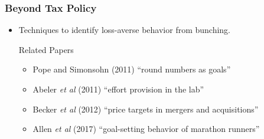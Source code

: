 \documentclass[dvipdfmx,12pt]{beamer}
\begin{document}
\begin{frame}\frametitle{Beyond Tax Policy}
  \begin{itemize}
    \item Techniques to identify loss-averse behavior from bunching.

    \begin{block}{Related Papers}
      \begin{itemize}
        \item Pope and Simonsohn (2011) ``round numbers as goals''

        \item Abeler \textit{et al} (2011) ``effort provision in the lab''

        \item Becker \textit{et al} (2012) ``price targets in mergers and acquisitions''

        \item Allen \textit{et al} (2017) ``goal-setting behavior of marathon runners''
      \end{itemize}
    \end{block}
  \end{itemize}
\end{frame}
\end{document}
